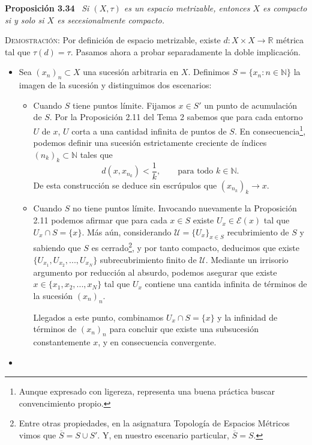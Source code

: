\documentclass[11pt]{article}
\begin{document}
\noindent\textbf{Proposición 3.34} \, \textit{Si $(X, \tau)$ es un espacio metrizable, entonces $X$ es compacto si y solo si $X$ es secesionalmente compacto.}

\medskip

\noindent\textsc{Demostración}: Por definición de espacio metrizable, existe $d : X \times X \to \mathbb{R}$ métrica tal que $\tau(d) = \tau$. Pasamos ahora a probar separadamente la doble implicación.

\begin{itemize}
    \item[($\Longrightarrow$)] Sea $(x_n)_n \subset X$ una sucesión arbitraria en $X$. Definimos $S = \{x_n : n \in \mathbb{N}\}$ la imagen de la sucesión y distinguimos dos escenarios:
    
    \begin{itemize}
        \item Cuando $S$ tiene puntos límite. Fijamos $x \in S'$ un punto de acumulación de $S$. Por la Proposición 2.11 del Tema 2 sabemos que para cada entorno $U$ de $x$, $U$ corta a una cantidad infinita de puntos de $S$. En consecuencia\footnote{Aunque expresado con ligereza, representa una buena práctica buscar convencimiento propio.}, podemos definir una sucesión estrictamente creciente de índices $(n_k)_k \subset \mathbb{N}$ tales que \[d(x, x_{n_k}) < \frac{1}{k}, \qquad \text{para todo $k \in \mathbb{N}$}.\] De esta construcción se deduce sin escrúpulos que $(x_{n_k})_k \longrightarrow x$.
        \item Cuando $S$ no tiene puntos límite. Invocando nuevamente la Proposición 2.11 podemos afirmar que para cada $x \in S$ existe $U_x \in \mathcal{E}(x)$ tal que $U_x \cap S = \{x\}$. Más aún, considerando $\mathcal{U} = \{U_x\}_{x \in S}$ recubrimiento de $S$ y sabiendo que $S$ es cerrado\footnote{Entre otras propiedades, en la asignatura Topología de Espacios Métricos vimos que $\overline{S} = S \cup S'$. Y, en nuestro escenario particular, $\overline{S} = S$.}, y por tanto compacto, deducimos que existe $\{U_{x_1}, U_{x_2}, ..., U_{x_N}\}$ subrecubrimiento finito de $\mathcal{U}$. Mediante un irrisorio argumento por reducción al absurdo, podemos asegurar que existe $x \in \{x_1, x_2, ..., x_N\}$ tal que $U_{x}$ contiene una cantida infinita de términos de la sucesión $(x_n)_n$.

        Llegados a este punto, combinamos $U_x \cap S = \{x\}$ y la infinidad de términos de $(x_n)_n$ para concluir que existe una subsucesión constantemente $x$, y en consecuencia convergente.
    \end{itemize}

    \item[($\Longleftarrow$)] 
\end{itemize}
\end{document}
